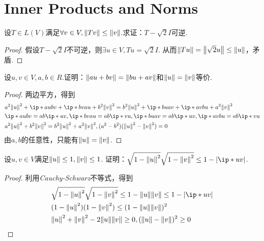 \section{Inner Products and Norms}

\begin{problem}[5]\label{6.A.5}
    设\(T \in L(V)\)满足\(\forall v \in V,\norm*{Tv} \leq \norm*{v}\).求证：\(T-\sqrt{2}I\)可逆.
\end{problem}

\begin{proof}
    假设\(T-\sqrt{2}I\)不可逆，则\(\exists u \in V,Tu=\sqrt{2}I\).
    从而\(\norm*{Tu}=\norm*{\sqrt{2}u} \leq \norm*{u}\)，矛盾.
\end{proof}

\begin{problem}[6]\label{6.A.6}
    设\(u,v \in V,a,b \in R\).证明：\(\norm*{au+bv}=\norm*{bu+av}\)和\(\norm*{u}=\norm*{v}\)等价.
\end{problem}

\begin{proof}
    两边平方，得到
    \begin{align*}
        &a^2\norm*{u}^2+\ip*{au}{bv}+\ip*{bv}{au}+b^2\norm*{v}^2=b^2\norm*{u}^2+\ip*{bu}{av}+\ip*{av}{bu}+a^2\norm*{v}^2 \\
        &\ip*{au}{bv}=ab\ip*{u}{v},\ip*{bv}{au}=ab\ip*{v}{u},\ip*{bu}{av}=ab\ip*{u}{v},\ip*{av}{bu}=ab\ip*{v}{u} \\
        &a^2\norm*{u}^2+b^2\norm*{v}^2=b^2\norm*{u}^2+a^2\norm*{v}^2,(a^2-b^2)(\norm*{u}^2-\norm*{v}^2)=0
    \end{align*}
    由\(a,b\)的任意性，只能有\(\norm*{u}=\norm*{v}\).
\end{proof}

\begin{problem}[9]\label{6.A.9}
    设\(u,v \in V\)满足\(\norm*{u} \leq 1,\norm*{v} \leq 1\).
    证明：\(\sqrt{1-\norm*{u}^2}\sqrt{1-\norm*{v}^2} \leq 1-\abs*{\ip*{u}{v}}\).
\end{problem}

\begin{proof}
    利用\textit{Cauchy-Schwarz}不等式，得到
    \begin{align*}
        &\sqrt{1-\norm*{u}^2}\sqrt{1-\norm*{v}^2} \leq 1-\norm*{u}\norm*{v} \leq 1-\abs*{\ip*{u}{v}} \\
        &(1-\norm*{u}^2)(1-\norm*{v}^2) \leq (1-\norm*{u}\norm*{v})^2 \\
        &\norm*{u}^2+\norm*{v}^2-2\norm*{u}\norm*{v} \geq 0,(\norm*{u}-\norm*{v})^2 \geq 0
    \end{align*}
\end{proof}

